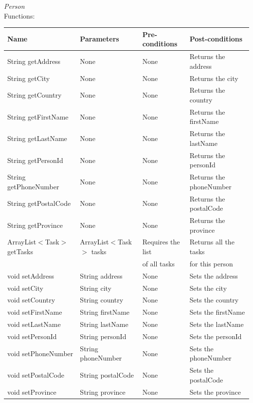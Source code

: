 \emph{Person}\\
Functions:\\
\begin{tabular}{| l | l | l | l |}
\hline
Name & Parameters & Pre-conditions & Post-conditions\\
\hline
		String getAddress		& None       			& None			& Returns the address\\
\hline
		String getCity			& None				& None       	 	& Returns the city \\
\hline
		String getCountry		& None				& None       	 	& Returns the country \\
\hline
		String getFirstName		& None				& None       	 	& Returns the firstName \\
\hline
		String getLastName		& None				& None       	 	& Returns the lastName \\
\hline
		String getPersonId		& None				& None       	 	& Returns the personId \\
\hline
		String getPhoneNumber	& None				& None       	 	& Returns the phoneNumber \\
\hline
		String getPostalCode		& None				& None       	 	& Returns the postalCode \\
\hline
		String getProvince		& None				& None       	 	& Returns the province \\
\hline
		ArrayList$<$Task$>$ getTasks		& ArrayList$<$Task$>$ tasks	& Requires the list 	& Returns all the tasks \\
					& 				& of all tasks 		& for this person \\
\hline
		void setAddress		& String address  		& None			& Sets the address\\
\hline
		void setCity			& String city			& None       	 	& Sets the city \\
\hline
		void setCountry		& String country		& None       	 	& Sets the country \\
\hline
		void setFirstName		& String firstName		& None       	 	& Sets the firstName \\
\hline
		void setLastName		& String lastName		& None       	 	& Sets the lastName \\
\hline
		void setPersonId		& String personId		& None       	 	& Sets the personId \\
\hline
		void setPhoneNumber	& String phoneNumber	& None       	 	& Sets the phoneNumber\\
\hline
		void setPostalCode		& String postalCode		& None       	 	& Sets the postalCode\\
\hline
		void setProvince		& String province		& None       	 	& Sets the province
\\
\hline
\end{tabular}
\\

